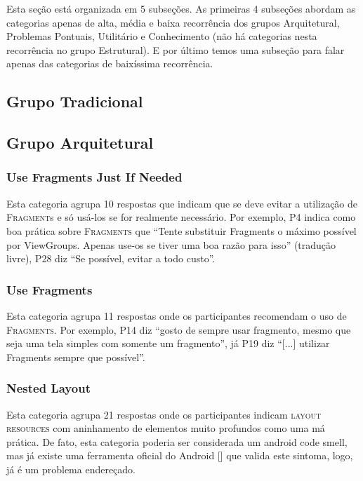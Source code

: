Esta se\c{c}\~ao est\'a organizada em 5 subse\c{c}\~oes. As primeiras 4 subse\c{c}\~oes abordam as categorias apenas de alta, m\'edia e baixa recorr\^encia dos grupos Arquitetural, Problemas Pontuais, Utilit\'ario e Conhecimento (não há categorias nesta recorr\^encia no grupo Estrutural). E por último temos uma subse\c{c}ão para falar apenas das categorias de baix\'issima recorr\^encia.

\subsection{Grupo Tradicional}

\subsection{Grupo Arquitetural}

\subsubsection{Use Fragments Just If Needed} 
Esta categoria agrupa 10 respostas que indicam que se deve evitar a utiliza\c{c}\~ao de \textsc{Fragment}s e s\'o us\'a-los se for realmente necess\'ario. Por exemplo, P4 indica como boa pr\'atica sobre \textsc{Fragments} que ``Tente substituir Fragments o m\'aximo poss\'ivel por ViewGroups. Apenas use-os se tiver uma boa raz\~ao para isso'' (tradu\c{c}\~ao livre), P28 diz ``Se poss\'ivel, evitar a todo custo''. 

\subsubsection{Use Fragments} 
Esta categoria agrupa 11 respostas onde os participantes recomendam o uso de \textsc{Fragments}. Por exemplo, P14 diz ``gosto de sempre usar fragmento, mesmo que seja uma tela simples com somente um fragmento'', j\'a P19 diz ``[...] utilizar Fragments sempre que poss\'ivel''. 

\subsubsection{Nested Layout} 
Esta categoria agrupa 21 respostas onde os participantes indicam \textsc{layout resources} com aninhamento de elementos muito profundos como uma m\'a pr\'atica. De fato, esta categoria poderia ser considerada um android code smell, mas j\'a existe uma ferramenta oficial do Android [] que valida este sintoma, logo, j\'a \'e um problema endere\c{c}ado.

